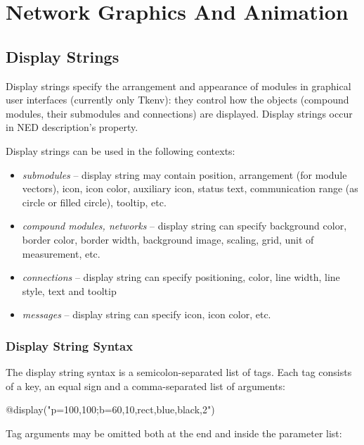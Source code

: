 \chapter{Network Graphics And Animation}
\label{cha:graphics}

\section{Display Strings}
\label{sec:ch-graphics:display-strings}

Display strings specify the arrangement and
appearance of modules in graphical user interfaces (currently only
Tkenv): they control how the objects (compound modules, their
submodules and connections) are displayed. Display strings occur in
NED description's 
property.

Display strings can be used in the following contexts:
\begin{itemize}
  \item \textit{submodules} -- display string may contain position, arrangement
        (for module vectors), icon, icon color, auxiliary icon, status text,
        communication range (as circle or filled circle), tooltip, etc.
  \item \textit{compound modules, networks} -- display string can specify
        background color, border color, border width,
        background image, scaling, grid, unit of measurement, etc.
  \item \textit{connections} -- display string can specify positioning, color,
        line width, line style, text and tooltip
  \item \textit{messages} -- display string can specify icon, icon color, etc.
\end{itemize}


\subsection{Display String Syntax}

The display string syntax is a semicolon-separated list of tags.
Each tag consists of a key, an equal sign and a comma-separated list of
arguments:

\begin{ned}
@display("p=100,100;b=60,10,rect,blue,black,2")
\end{ned}

Tag arguments may be omitted both at the end and inside the
parameter list:


